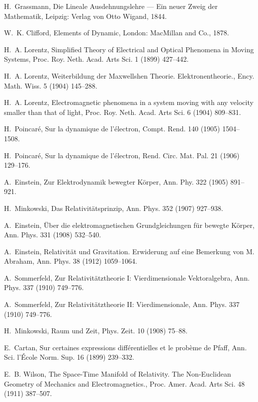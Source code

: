 \documentclass[1p,sort&compress]{elsarticle}
\numberwithin{equation}{section}
\begin{document}
\begin{thebibliography}{999}
H.~Grassmann, {Die Lineale Ausdehnungslehre --- Ein neuer Zweig der
  Mathematik}, Leipzig: Verlag von Otto Wigand, 1844.

W.~K. Clifford, {Elements of Dynamic}, London: MacMillan and Co., 1878.

H.~A. Lorentz, {Simplified Theory of Electrical and Optical Phenomena in Moving
  Systems}, Proc. Roy. Neth. Acad. Arts Sci. 1 (1899) 427--442.

H.~A. Lorentz, {Weiterbildung der Maxwellshen Theorie. Elektronentheorie.},
  Ency. Math. Wiss. 5 (1904) 145--288.

H.~A. Lorentz, {Electromagnetic phenomena in a system moving with any velocity
  smaller than that of light}, Proc. Roy. Neth. Acad. Arts Sci. 6 (1904)
  809--831.

H.~Poincar\'e, {Sur la dynamique de l'\'electron}, Compt. Rend. 140 (1905)
  1504--1508.

H.~Poincar\'e, {Sur la dynamique de l'\'electron}, Rend. Circ. Mat. Pal. 21
  (1906) 129--176.

A.~Einstein, {Zur Elektrodynamik bewegter K\"orper}, Ann. Phy. 322 (1905)
  891--921.

H.~Minkowski, {Das Relativit\"atsprinzip}, Ann. Phys. 352 (1907) 927--938.

A.~Einstein, {\"Uber die elektromagnetischen Grundgleichungen f\"ur bewegte
  K\"orper}, Ann. Phys. 331 (1908) 532--540.

A.~Einstein, {Relativit\"at und Gravitation. Erwiderung auf eine Bemerkung von
  M. Abraham}, Ann. Phys. 38 (1912) 1059--1064.

A.~Sommerfeld, {Zur Relativit\"atztheorie I: Vierdimensionale Vektoralgebra},
  Ann. Phys. 337 (1910) 749--776.

A.~Sommerfeld, {Zur Relativit\"atztheorie II: Vierdimensionale}, Ann. Phys. 337
  (1910) 749--776.

H.~Minkowski, {Raum und Zeit}, Phys. Zeit. 10 (1908) 75--88.

E.~Cartan, {Sur certaines expressions diff\'erentielles et le prob\`eme de
  Pfaff}, Ann. Sci. l'\'Ecole Norm. Sup. 16 (1899) 239--332.

E.~B. Wilson, {The Space-Time Manifold of Relativity. The Non-Euclidean
  Geometry of Mechanics and Electromagnetics.}, Proc. Amer. Acad. Arts Sci. 48
  (1911) 387--507.


\end{thebibliography}
\end{document}
